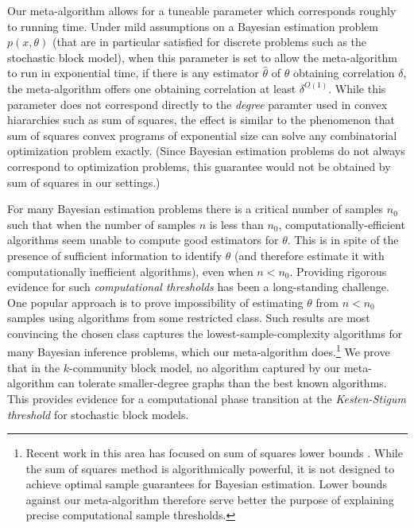 %
Our meta-algorithm allows for a tuneable parameter which corresponds roughly to running time.
Under mild assumptions on a Bayesian estimation problem $p(x,\theta)$ (that are in particular satisfied for discrete problems such as the stochastic block model), when this parameter is set to allow the meta-algorithm to run in exponential time, if there is any estimator $\hat{\theta}$ of $\theta$ obtaining correlation $\delta$, the meta-algorithm offers one obtaining correlation at least $\delta^{O(1)}$.
While this parameter does not correspond directly to the \emph{degree} paramter used in convex hiararchies such as sum of squares, the effect is similar to the phenomenon that sum of squares convex programs of exponential size can solve any combinatorial optimization problem exactly.
(Since Bayesian estimation problems do not always correspond to optimization problems, this guarantee would not be obtained by sum of squares in our settings.)

%
For many Bayesian estimation problems there is a critical number of samples $n_0$ such that when the number of samples $n$ is less than $n_0$, computationally-efficient algorithms seem unable to compute good estimators for $\theta$.
This is in spite of the presence of sufficient information to identify $\theta$ (and therefore estimate it with computationally inefficient algorithms), even when $n < n_0$.
Providing rigorous evidence for such \emph{computational thresholds} has been a long-standing challenge.
One popular approach is to prove impossibility of estimating $\theta$ from $n < n_0$ samples using algorithms from some restricted class.
Such results are most convincing the chosen class captures the lowest-sample-complexity algorithms for many Bayesian inference problems, which our meta-algorithm does.\footnote{Recent work in this area has focused on sum of squares lower bounds \cite{DBLP:conf/colt/HopkinsSS15, DBLP:conf/nips/MaW15, DBLP:conf/focs/BarakHKKMP16}. While the sum of squares method is algorithmically powerful, it is not designed to achieve optimal sample guarantees for Bayesian estimation. Lower bounds against our meta-algorithm therefore serve better the purpose of explaining precise computational sample thresholds.}
We prove that in the $k$-community block model, no algorithm captured by our meta-algorithm can tolerate smaller-degree graphs than the best known algorithms.
This provides evidence for a computational phase transition at the \emph{Kesten-Stigum threshold} for stochastic block models.
\Dnote{}

